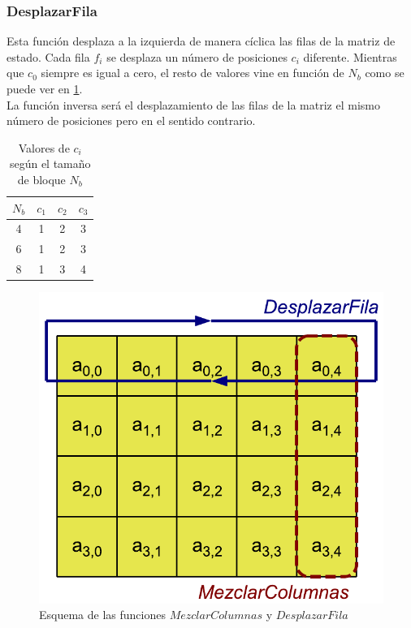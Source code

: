 	\subsubsection{DesplazarFila}
		Esta función desplaza a la izquierda de manera cíclica las filas de la matriz de estado. Cada fila $f_i$ se desplaza un número de posiciones $c_i$ diferente. Mientras que $c_0$ siempre es igual a cero, el resto de valores vine en función de $N_b$ como se puede ver en \ref{ciennb}.\\
		La función inversa será el desplazamiento de las filas de la matriz el mismo número de posiciones pero en el sentido contrario.

		\begin{table}[htb]
			\begin{center}
				\begin{tabular}{| c | c | c | c |}
						\hline
						$N_b$ & $c_1$ & $c_2$ & $c_3$\\ \hline
						4 & 1 & 2 & 3\\ \hline 
						6 & 1 & 2 & 3\\ \hline 
						8 & 1 & 3 & 4\\ \hline 
				\end{tabular}
				\caption{Valores de $c_i$ según el tamaño de bloque $N_b$}
				\label{ciennb}
			\end{center}
		\end{table}

		\begin{figure}[htb]
			\centering
			\includegraphics[scale=0.4]{imagenes/aesdesplazarmezclar.png} 
			\caption{Esquema de las funciones $MezclarColumnas$ y $DesplazarFila$ \cite{En2011}}
			\label{desplazarymezclar}
		\end{figure}

